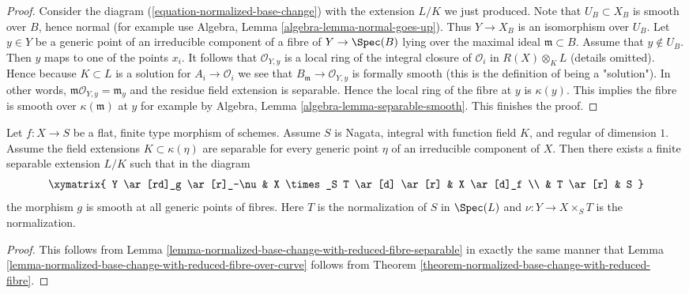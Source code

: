 \begin{proof}
\medskip\noindent
Consider the diagram (\ref{equation-normalized-base-change})
with the extension $L/K$ we just produced. Note that $U_B \subset X_B$
is smooth over $B$, hence normal (for example use
Algebra, Lemma \ref{algebra-lemma-normal-goes-up}).
Thus $Y \to X_B$ is an isomorphism over $U_B$.
Let $y \in Y$ be a generic point of an irreducible
component of a fibre of $Y \to \Spec(B)$ lying over the maximal
ideal $\mathfrak m \subset B$. Assume that $y \not \in U_B$.
Then $y$ maps to one of the points $x_i$. It follows that
$\mathcal{O}_{Y, y}$ is a local ring of the integral closure
of $\mathcal{O}_i$ in $R(X) \otimes_K L$ (details omitted).
Hence because $K \subset L$ is a solution for
$A_i \to \mathcal{O}_i$ we see that
$B_\mathfrak m \to \mathcal{O}_{Y, y}$ is formally smooth
(this is the definition of being a "solution").
In other words, $\mathfrak m\mathcal{O}_{Y, y} = \mathfrak m_y$
and the residue field extension is separable. Hence the local ring
of the fibre at $y$ is $\kappa(y)$.
This implies the fibre is smooth over $\kappa(\mathfrak m)$
at $y$ for example by Algebra, Lemma \ref{algebra-lemma-separable-smooth}.
This finishes the proof.
\end{proof}

\begin{lemma}
\label{lemma-normalized-base-change-with-reduced-fibre-over-curve-separable}
Let $f : X \to S$ be a flat, finite type morphism of schemes.
Assume $S$ is Nagata, integral with function field $K$, and
regular of dimension $1$. Assume the field extensions $K \subset \kappa(\eta)$
are separable for every generic point $\eta$ of an irreducible
component of $X$. Then there exists a finite separable extension $L/K$
such that in the diagram
$$
\xymatrix{
Y \ar[rd]_g \ar[r]_-\nu & X \times_S T \ar[d] \ar[r] & X \ar[d]_f \\
& T \ar[r] & S
}
$$
the morphism $g$ is smooth at all generic points of fibres. Here
$T$ is the normalization of $S$ in $\Spec(L)$ and $\nu : Y \to X \times_S T$
is the normalization.
\end{lemma}

\begin{proof}
This follows from
Lemma \ref{lemma-normalized-base-change-with-reduced-fibre-separable}
in exactly the same manner that
Lemma \ref{lemma-normalized-base-change-with-reduced-fibre-over-curve}
follows from
Theorem \ref{theorem-normalized-base-change-with-reduced-fibre}.
\end{proof}








